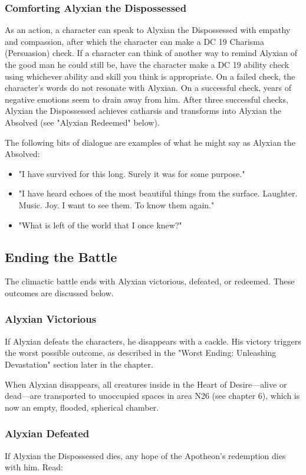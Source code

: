 \documentclass[10pt,a4paper,twoside,fancy,bg=print,twocolumn,openany,nodeprecatedcode]{dndbook}
\begin{document}
\subsubsection{Comforting Alyxian the Dispossessed}
As an action, a character can speak to Alyxian the Dispossessed with empathy and compassion, after which the character can make a DC 19 Charisma (Persuasion) check. If a character can think of another way to remind Alyxian of the good man he could still be, have the character make a DC 19 ability check using whichever ability and skill you think is appropriate. On a failed check, the character's words do not resonate with Alyxian. On a successful check, years of negative emotions seem to drain away from him. After three successful checks, Alyxian the Dispossessed achieves catharsis and transforms into Alyxian the Absolved (see "Alyxian Redeemed" below).

The following bits of dialogue are examples of what he might say as Alyxian the Absolved:


\begin{itemize}
\item "I have survived for this long. Surely it was for some purpose."
\item "I have heard echoes of the most beautiful things from the surface. Laughter. Music. Joy. I want to see them. To know them again."
\item "What is left of the world that I once knew?"
\end{itemize}

\subsection{Ending the Battle}
The climactic battle ends with Alyxian victorious, defeated, or redeemed. These outcomes are discussed below.

\subsubsection{Alyxian Victorious}
If Alyxian defeats the characters, he disappears with a cackle. His victory triggers the worst possible outcome, as described in the "Worst Ending: Unleashing Devastation" section later in the chapter.

When Alyxian disappears, all creatures inside in the Heart of Desire—alive or dead—are transported to unoccupied spaces in area N26 (see chapter 6), which is now an empty, flooded, spherical chamber.

\subsubsection{Alyxian Defeated}
If Alyxian the Dispossessed dies, any hope of the Apotheon's redemption dies with him. Read:
\end{document}
